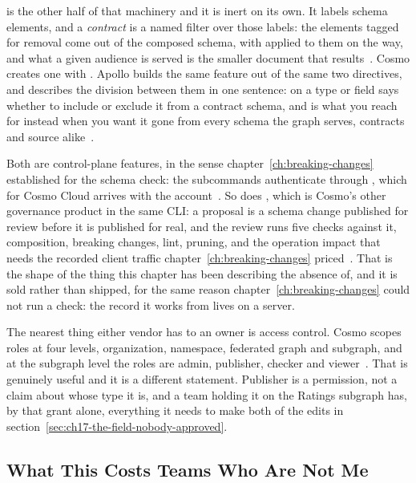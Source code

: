 %
 is the other half of that machinery and it is inert on its own. It
labels schema elements, and a \emph{contract} is a named filter over those
labels: the elements tagged for removal come out of the composed schema, with
 applied to them on the way, and what a given audience is
served is the smaller document that results~\autocite{cosmocontracts}. Cosmo
creates one with . Apollo builds the same feature out
of the same two directives, and describes the division between them in one
sentence:  on a type or field says whether to include or exclude it
from a contract schema, and  is what you reach for instead
when you want it gone from every schema the graph serves, contracts and source
alike~\autocite{apollocontracts}.

%
Both are control-plane features, in the sense
chapter~\ref{ch:breaking-changes} established for the schema check: the
subcommands authenticate through , which for Cosmo Cloud
arrives with the account~\autocite{cosmocli}. So does ,
which is Cosmo's other governance product in the same CLI: a proposal is a
schema change published for review before it is published for real, and the
review runs five checks against it, composition, breaking changes, lint,
pruning, and the operation impact that needs the recorded client traffic
chapter~\ref{ch:breaking-changes} priced~\autocite{cosmoproposals}. That is
the shape of the thing this
chapter has been describing the absence of, and it is sold rather than
shipped, for the same reason chapter~\ref{ch:breaking-changes} could not run a
check: the record it works from lives on a server.

%
The nearest thing either vendor has to an owner is access control. Cosmo
scopes roles at four levels, organization, namespace, federated graph and
subgraph, and at the subgraph level the roles are admin, publisher, checker
and viewer~\autocite{cosmogrouprules}. That is genuinely useful and it is a
different statement. Publisher is a permission, not a claim about whose type
it is, and a team holding it on the Ratings subgraph has, by that grant alone,
everything it needs to make both of the edits in
section~\ref{sec:ch17-the-field-nobody-approved}.

\subsection{What This Costs Teams Who Are Not Me}

